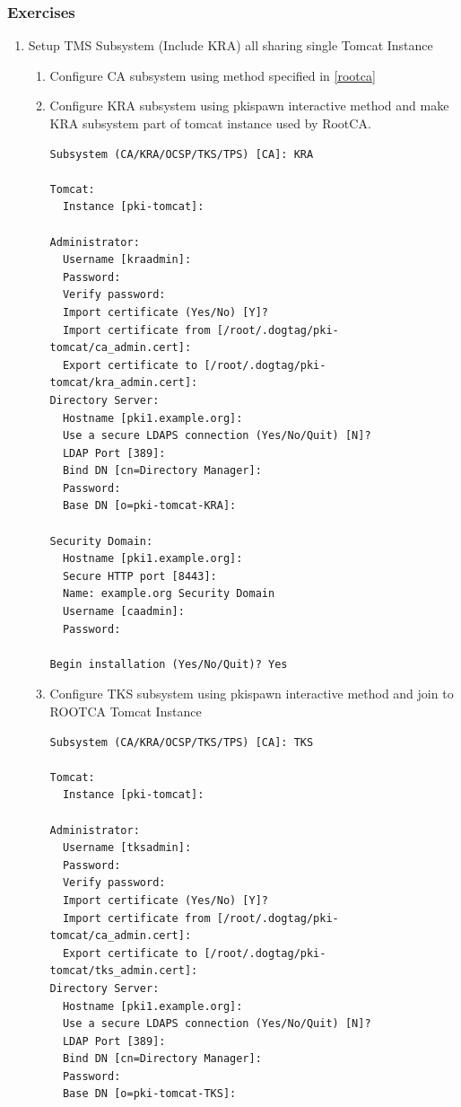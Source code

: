 \documentclass[a4paper]{article}
\begin{document}
\subsubsection{Exercises}
    \begin{enumerate}[label*=\arabic*.]
        \item \label{shared_tomcat_tms}Setup TMS Subsystem (Include KRA) all sharing single Tomcat Instance
            \begin{enumerate}[label*=\arabic*.]
                \item \label{shared_ca} Configure CA subsystem using method specified in \ref{rootca}
                \item \label{shared_kra} Configure KRA subsystem using pkispawn interactive method and 
                    make KRA subsystem part of tomcat instance used by RootCA.
                    \begin{lstlisting}
Subsystem (CA/KRA/OCSP/TKS/TPS) [CA]: KRA

Tomcat:
  Instance [pki-tomcat]: 

Administrator:
  Username [kraadmin]: 
  Password: 
  Verify password: 
  Import certificate (Yes/No) [Y]? 
  Import certificate from [/root/.dogtag/pki-tomcat/ca_admin.cert]: 
  Export certificate to [/root/.dogtag/pki-tomcat/kra_admin.cert]: 
Directory Server:
  Hostname [pki1.example.org]: 
  Use a secure LDAPS connection (Yes/No/Quit) [N]? 
  LDAP Port [389]: 
  Bind DN [cn=Directory Manager]:  
  Password: 
  Base DN [o=pki-tomcat-KRA]: 

Security Domain:
  Hostname [pki1.example.org]: 
  Secure HTTP port [8443]: 
  Name: example.org Security Domain
  Username [caadmin]: 
  Password: 

Begin installation (Yes/No/Quit)? Yes
                    \end{lstlisting}
                \item \label {shared_tks} Configure TKS subsystem using pkispawn interactive method and join to 
                    ROOTCA Tomcat Instance
                    \begin{lstlisting}
Subsystem (CA/KRA/OCSP/TKS/TPS) [CA]: TKS

Tomcat:
  Instance [pki-tomcat]:

Administrator:
  Username [tksadmin]:
  Password:
  Verify password:
  Import certificate (Yes/No) [Y]?
  Import certificate from [/root/.dogtag/pki-tomcat/ca_admin.cert]:
  Export certificate to [/root/.dogtag/pki-tomcat/tks_admin.cert]:
Directory Server:
  Hostname [pki1.example.org]:
  Use a secure LDAPS connection (Yes/No/Quit) [N]?
  LDAP Port [389]:
  Bind DN [cn=Directory Manager]:
  Password:
  Base DN [o=pki-tomcat-TKS]:


\end{lstlisting}
\end{enumerate}
\end{enumerate}
\end{document}
